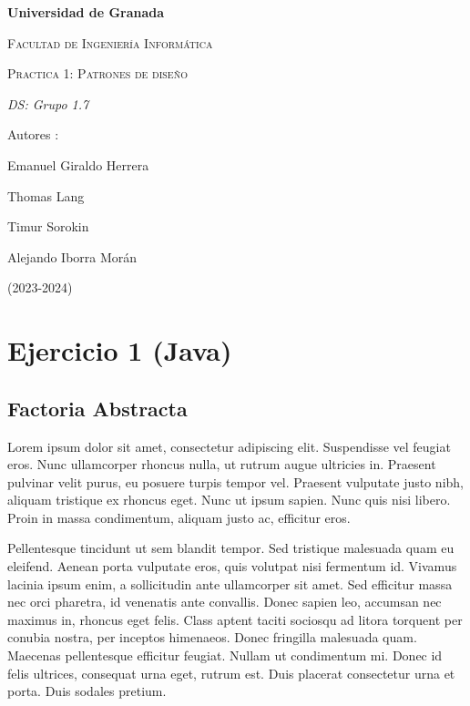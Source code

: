\documentclass{article}
\begin{document}
	\begin{titlepage}
		\centering
		{\bfseries\LARGE Universidad de Granada\par}
		\vspace{1cm}
		{\scshape\Large Facultad de Ingeniería Informática \par}
		\vspace{3cm}
		{\scshape\Huge Practica 1: Patrones de diseño \par}
		\vspace{3cm}
		{\itshape\Large DS: Grupo 1.7\par}
		\vfill
		{\Large Autores : \par}
			{\Large  Emanuel Giraldo Herrera\par}
	{\Large  Thomas Lang \par}
	{\Large  Timur Sorokin \par}
	{\Large  Alejando Iborra Morán \par}
		\vfill
	{\Large (2023-2024) \par}
	\end{titlepage}
	
	\section{Ejercicio 1 (Java)}
	\subsection{Factoria Abstracta}
	
	
	Lorem ipsum dolor sit amet, consectetur adipiscing elit. Suspendisse vel feugiat eros. Nunc ullamcorper rhoncus nulla, ut rutrum augue ultricies in. Praesent pulvinar velit purus, eu posuere turpis tempor vel. Praesent vulputate justo nibh, aliquam tristique ex rhoncus eget. Nunc ut ipsum sapien. Nunc quis nisi libero. Proin in massa condimentum, aliquam justo ac, efficitur eros.
	
	Pellentesque tincidunt ut sem blandit tempor. Sed tristique malesuada quam eu eleifend. Aenean porta vulputate eros, quis volutpat nisi fermentum id. Vivamus lacinia ipsum enim, a sollicitudin ante ullamcorper sit amet. Sed efficitur massa nec orci pharetra, id venenatis ante convallis. Donec sapien leo, accumsan nec maximus in, rhoncus eget felis. Class aptent taciti sociosqu ad litora torquent per conubia nostra, per inceptos himenaeos. Donec fringilla malesuada quam. Maecenas pellentesque efficitur feugiat. Nullam ut condimentum mi. Donec id felis ultrices, consequat urna eget, rutrum est. Duis placerat consectetur urna et porta. Duis sodales pretium. 
\end{document}
